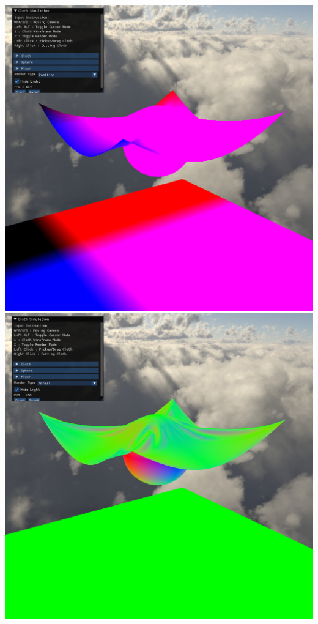 \documentclass{article}
\begin{document}
\begin{multicols}{2}
\centering
\includegraphics[scale = 0.2]{Deferred_Position}
\includegraphics[scale = 0.2]{Deferred_Normal}

\end{multicols}
\end{document}
